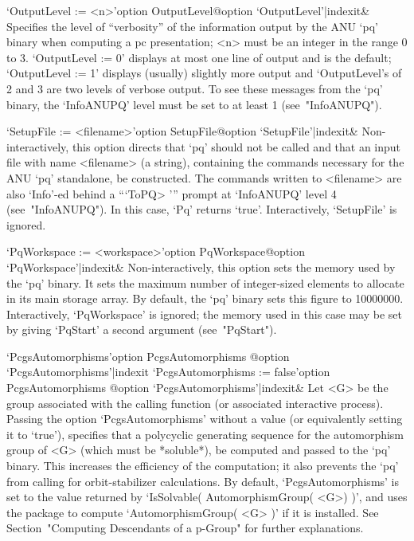 \>`OutputLevel := <n>'{option OutputLevel}@{option `OutputLevel'|indexit}&
Specifies the level of ``verbosity'' of the information output by the ANU
`pq' binary when computing a pc presentation; <n> must be an  integer  in
the range 0 to 3. `OutputLevel := 0' displays at most one line of  output
and is the default; `OutputLevel := 1' displays (usually)  slightly  more
output and `OutputLevel's of 2 and 3 are two levels of verbose output. To
see these messages from the `pq' binary, the `InfoANUPQ'  level  must  be
set to at least 1 (see~"InfoANUPQ").

\>`SetupFile := <filename>'{option SetupFile}@{option `SetupFile'|indexit}&
Non-interactively, this option directs that `pq' should not be called and
that an input file  with  name  <filename>  (a  string),  containing  the
commands necessary for the  ANU  `pq'  standalone,  be  constructed.  The
commands written to <filename> are also `Info'-ed behind  a  ```ToPQ> '''
prompt at `InfoANUPQ' level  4  (see~"InfoANUPQ").  In  this  case,  `Pq'
returns `true'. Interactively, `SetupFile' is ignored.

\>`PqWorkspace := <workspace>'{option PqWorkspace}@{option `PqWorkspace'|indexit}&
Non-interactively, this option sets the memory used by the  `pq'  binary.
It sets the maximum number of integer-sized elements to allocate  in  its
main storage array. By default, the  `pq'  binary  sets  this  figure  to
10000000. Interactively, `PqWorkspace' is ignored;  the  memory  used  in
this  case  may  be  set  by   giving   `PqStart'   a   second   argument
(see~"PqStart").

\>`PcgsAutomorphisms'{option PcgsAutomorphisms}%
@{option `PcgsAutomorphisms'|indexit}
\>`PcgsAutomorphisms := false'{option PcgsAutomorphisms}%
@{option `PcgsAutomorphisms'|indexit}&
Let <G> be the group associated with the calling function (or  associated
interactive process). Passing the option  `PcgsAutomorphisms'  without  a
value (or equivalently setting it to `true'), specifies that a polycyclic
generating sequence for the automorphism group  of  <G>  (which  must  be
*soluble*), be computed and passed to the `pq' binary. This increases the
efficiency of the computation; it also prevents  the  `pq'  from  calling
{\GAP} for orbit-stabilizer calculations. By default, `PcgsAutomorphisms'
is set to the value returned by `IsSolvable( AutomorphismGroup( <G>)  )',
and uses the package {\AutPGrp} to compute `AutomorphismGroup( <G> )'  if
it is installed. See Section~"Computing Descendants  of  a  p-Group"  for
further explanations.

